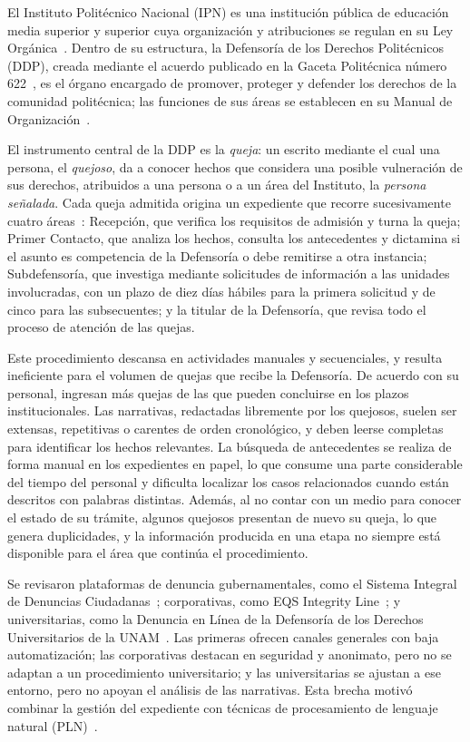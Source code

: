 \documentclass[conference,letterpaper]{IEEEtran}
\begin{document}
El Instituto Politécnico Nacional (IPN) es una institución pública de educación media superior y superior cuya organización y atribuciones se regulan en su Ley Orgánica~\cite{ipn_ley}. Dentro de su estructura, la Defensoría de los Derechos Politécnicos (DDP), creada mediante el acuerdo publicado en la Gaceta Politécnica número 622~\cite{ipn_acuerdo622}, es el órgano encargado de promover, proteger y defender los derechos de la comunidad politécnica; las funciones de sus áreas se establecen en su Manual de Organización~\cite{ipn_mo_ddp}.

El instrumento central de la DDP es la \emph{queja}: un escrito mediante el cual una persona, el \emph{quejoso}, da a conocer hechos que considera una posible vulneración de sus derechos, atribuidos a una persona o a un área del Instituto, la \emph{persona señalada}. Cada queja admitida origina un expediente que recorre sucesivamente cuatro áreas~\cite{ipn_mp_ddp}: Recepción, que verifica los requisitos de admisión y turna la queja; Primer Contacto, que analiza los hechos, consulta los antecedentes y dictamina si el asunto es competencia de la Defensoría o debe remitirse a otra instancia; Subdefensoría, que investiga mediante solicitudes de información a las unidades involucradas, con un plazo de diez días hábiles para la primera solicitud y de cinco para las subsecuentes; y la titular de la Defensoría, que revisa todo el proceso de atención de las quejas.

Este procedimiento descansa en actividades manuales y secuenciales, y resulta ineficiente para el volumen de quejas que recibe la Defensoría. De acuerdo con su personal, ingresan más quejas de las que pueden concluirse en los plazos institucionales. Las narrativas, redactadas libremente por los quejosos, suelen ser extensas, repetitivas o carentes de orden cronológico, y deben leerse completas para identificar los hechos relevantes. La búsqueda de antecedentes se realiza de forma manual en los expedientes en papel, lo que consume una parte considerable del tiempo del personal y dificulta localizar los casos relacionados cuando están descritos con palabras distintas. Además, al no contar con un medio para conocer el estado de su trámite, algunos quejosos presentan de nuevo su queja, lo que genera duplicidades, y la información producida en una etapa no siempre está disponible para el área que continúa el procedimiento.

Se revisaron plataformas de denuncia gubernamentales, como el Sistema Integral de Denuncias Ciudadanas~\cite{sidec}; corporativas, como EQS Integrity Line~\cite{eqs}; y universitarias, como la Denuncia en Línea de la Defensoría de los Derechos Universitarios de la UNAM~\cite{unam_ddu}. Las primeras ofrecen canales generales con baja automatización; las corporativas destacan en seguridad y anonimato, pero no se adaptan a un procedimiento universitario; y las universitarias se ajustan a ese entorno, pero no apoyan el análisis de las narrativas. Esta brecha motivó combinar la gestión del expediente con técnicas de procesamiento de lenguaje natural (PLN)~\cite{jurafsky}.
\end{document}
